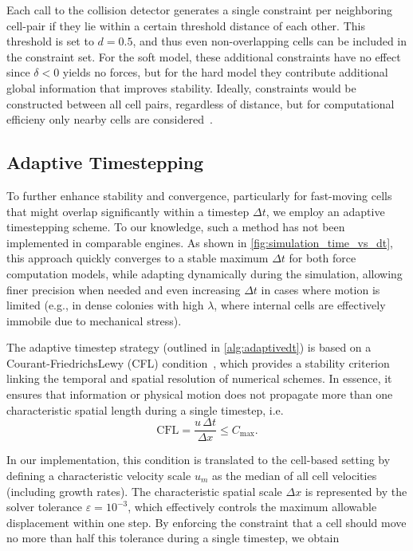 \documentclass[conference]{IEEEtran}
\begin{document}
Each call to the collision detector generates a single constraint per neighboring cell-pair if they lie within a certain threshold distance of each other. This threshold is set to $d=0.5$, and thus even non-overlapping cells can be included in the constraint set. For the soft model, these additional constraints have no effect since $\delta < 0$ yields no forces, but for the hard model they contribute additional global information that improves stability. Ideally, constraints would be constructed between all cell pairs, regardless of distance, but for computational efficieny only nearby cells are considered~\cite{Yan2019, Yan2022}.


\subsection{Adaptive Timestepping}

To further enhance stability and convergence, particularly for fast-moving cells that might overlap significantly within a timestep $\Delta t$, we employ an adaptive timestepping scheme. To our knowledge, such a method has not been implemented in comparable engines. As shown in \autoref{fig:simulation_time_vs_dt}, this approach quickly converges to a stable maximum $\Delta t$ for both force computation models, while adapting dynamically during the simulation, allowing finer precision when needed and even increasing $\Delta t$ in cases where motion is limited (e.g., in dense colonies with high $\lambda$, where internal cells are effectively immobile due to mechanical stress).


The adaptive timestep strategy (outlined in \autoref{alg:adaptivedt}) is based on a Courant-FriedrichsLewy (CFL) condition~\cite{Courant1928}, which provides a stability criterion linking the temporal and spatial resolution of numerical schemes. In essence, it ensures that information or physical motion does not propagate more than one characteristic spatial length during a single timestep, i.e.
\begin{equation}
    \text{CFL} = \frac{u \, \Delta t}{\Delta x} \leq C_{\text{max}}.
\end{equation}

In our implementation, this condition is translated to the cell-based setting by defining a characteristic velocity scale $u_m$ as the median of all cell velocities (including growth rates).
The characteristic spatial scale $\Delta x$ is represented by the solver tolerance $\varepsilon = 10^{-3}$, which effectively controls the maximum allowable displacement within one step.
By enforcing the constraint that a cell should move no more than half this tolerance during a single timestep, we obtain
\end{document}
